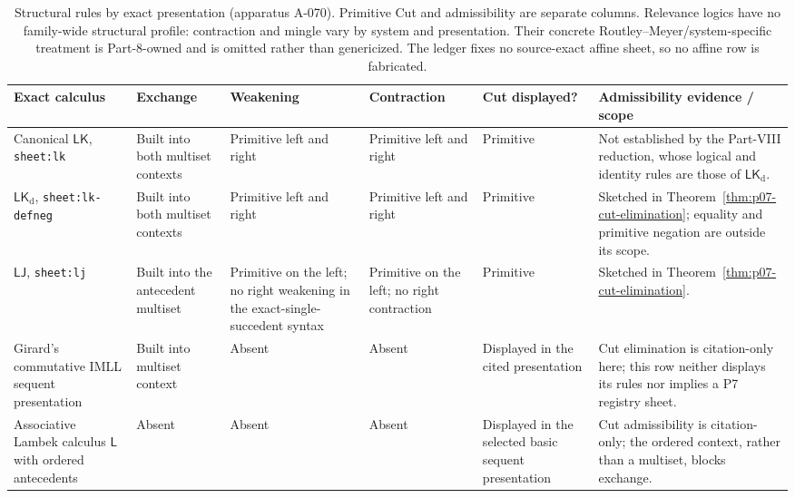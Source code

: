\begin{table}[!htbp]
\centering
\begingroup\scriptsize
\setlength{\tabcolsep}{3pt}
\begin{tabular}{@{}p{}p{}p{}
  p{}p{}p{}@{}}
\toprule
Exact calculus & Exchange & Weakening & Contraction & Cut displayed? &
Admissibility evidence / scope \\
\midrule
Canonical \(\mathsf{LK}\), \texttt{sheet:lk} & Built into both multiset
contexts & Primitive left and right & Primitive left and right & Primitive &
Not established by the Part-VIII reduction, whose logical and identity rules
are those of \(\mathsf{LK}_{\mathrm d}\). \\
\(\mathsf{LK}_{\mathrm d}\), \texttt{sheet:lk-defneg} & Built into both
multiset contexts & Primitive left and right & Primitive left and right &
Primitive & Sketched in Theorem~\ref{thm:p07-cut-elimination}; equality and
primitive negation are outside its scope. \\
\(\mathsf{LJ}\), \texttt{sheet:lj} & Built into the antecedent multiset &
Primitive on the left; no right weakening in the exact-single-succedent
syntax & Primitive on the left; no right contraction & Primitive & Sketched
in Theorem~\ref{thm:p07-cut-elimination}. \\
Girard's commutative IMLL sequent presentation & Built into multiset context &
Absent & Absent & Displayed in the cited presentation & Cut elimination is
citation-only here; this row neither displays its rules nor implies a P7
registry sheet. \\
Associative Lambek calculus \(\mathsf L\) with ordered antecedents & Absent &
Absent & Absent & Displayed in the selected basic sequent presentation &
Cut admissibility is citation-only; the ordered context, rather than a
multiset, blocks exchange. \\
\bottomrule
\end{tabular}
\endgroup
\caption{Structural rules by exact presentation (apparatus A-070).  Primitive
Cut and admissibility are separate columns.  Relevance logics have no
family-wide structural profile: contraction and mingle vary by system and
presentation.  Their concrete Routley--Meyer/system-specific treatment is
Part-8-owned and is omitted rather than genericized.  The ledger fixes no
source-exact affine sheet, so no affine row is fabricated.}
\label{tab:p07-structural-rules}
\end{table}


